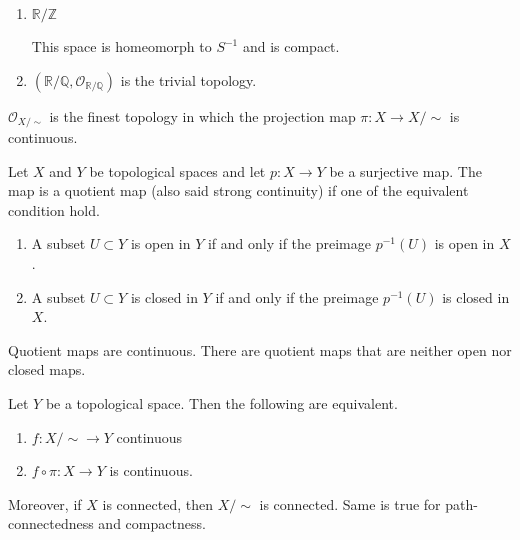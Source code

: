 %
\begin{exmbox}
    \begin{example}
        \begin{enumerate}
            \item \(\mathbb{R} / \mathbb{Z}\)

            This space is homeomorph to \(S^{-1}\) and is compact.
            \item \((\mathbb{R} / \mathbb{Q}, \mathcal{O}_{\mathbb{R} / \mathbb{Q}})\) is the trivial topology.
        \end{enumerate}
    \end{example}
\end{exmbox}

\begin{thmbox}
    \begin{proposition}
        \(\mathcal{O}_{X / \sim}\) is the {\color{maththen}finest} {\color{mathobj}topology} in which the {\color{mathif}projection map} \(\pi: X \longrightarrow X / \sim\) is {\color{mathif}continuous}.
    \end{proposition}
\end{thmbox}
\begin{defbox}
    Let \(X\) and \(Y\) be topological spaces and let \(p: X \longrightarrow Y\) be a surjective map. The map is a quotient map (also said strong continuity) if one of the equivalent condition hold.
    \begin{enumerate}
        \item A subset \(U \subset Y\) is open in \(Y\) if and only if the preimage \(p^{-1}(U)\) is open in \(X\).
        \item A subset \(U \subset Y\) is closed in \(Y\) if and only if the preimage \(p^{-1}(U)\) is closed in \(X\).
    \end{enumerate}
\end{defbox}
\begin{rembox}
    \begin{remark}
        Quotient maps are continuous. There are quotient maps that are neither open nor closed maps.
    \end{remark}
\end{rembox}

\begin{thmbox}
    \begin{theorem}
        Let \(Y\) be a topological space. Then the following are equivalent.
        \begin{enumerate}
            \item \(f: X / \sim \longrightarrow Y\) continuous
            \item \(f \circ \pi : X \longrightarrow Y\) is continuous.
        \end{enumerate}

        Moreover, if \(X\) is connected, then \(X / \sim\) is connected. Same is true for path-connectedness and compactness.
    \end{theorem}
\end{thmbox}

